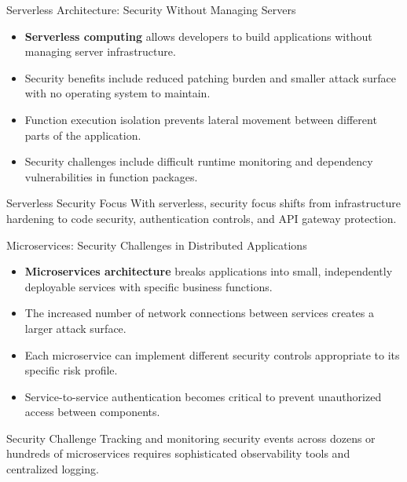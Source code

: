 \documentclass{beamer}
\begin{document}
    \begin{frame}{Serverless Architecture: Security Without Managing Servers}
        \begin{itemize}
        \item \textbf{Serverless computing} allows developers to build applications without managing server infrastructure.
        \item Security benefits include reduced patching burden and smaller attack surface with no operating system to maintain.
        \item Function execution isolation prevents lateral movement between different parts of the application.
        \item Security challenges include difficult runtime monitoring and dependency vulnerabilities in function packages.
        \end{itemize}
        
        \begin{block}{Serverless Security Focus}
        With serverless, security focus shifts from infrastructure hardening to code security, authentication controls, and API gateway protection.
        \end{block}
        \end{frame}
        
        \begin{frame}{Microservices: Security Challenges in Distributed Applications}
        \begin{itemize}
        \item \textbf{Microservices architecture} breaks applications into small, independently deployable services with specific business functions.
        \item The increased number of network connections between services creates a larger attack surface.
        \item Each microservice can implement different security controls appropriate to its specific risk profile.
        \item Service-to-service authentication becomes critical to prevent unauthorized access between components.
        \end{itemize}
        
        \begin{alertblock}{Security Challenge}
        Tracking and monitoring security events across dozens or hundreds of microservices requires sophisticated observability tools and centralized logging.
        \end{alertblock}
        \end{frame}
        
\end{document}
